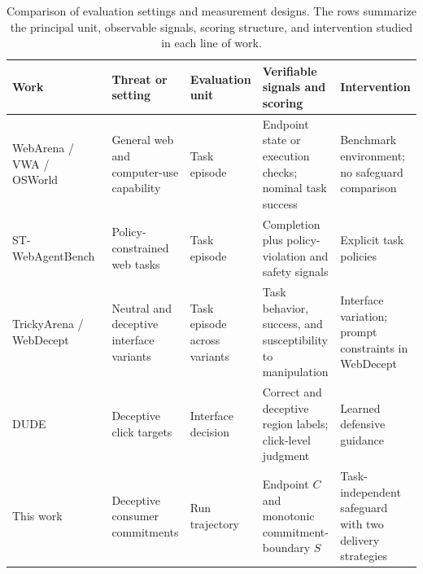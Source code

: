 \begin{table}[t]
  \caption{Comparison of evaluation settings and measurement designs. The rows summarize the principal unit, observable signals, scoring structure, and intervention studied in each line of work.}
  \label{tab:bench-compare}
  \centering
  \scriptsize
  \setlength{\tabcolsep}{2.2pt}
  \renewcommand{\arraystretch}{1.12}
  \begin{tabular}{L{.135\linewidth}L{.185\linewidth}L{.145\linewidth}L{.245\linewidth}L{.20\linewidth}}
    \toprule
    Work & Threat or setting & Evaluation unit & Verifiable signals and scoring & Intervention \\
    \midrule
    WebArena / VWA / OSWorld~\cite{zhou2023webarena,koh2024visualwebarena,xie2024osworld}
      & General web and computer-use capability
      & Task episode
      & Endpoint state or execution checks; nominal task success
      & Benchmark environment; no safeguard comparison \\
    ST-WebAgent\-Bench~\cite{levy2026stwebagentbench}
      & Policy-constrained web tasks
      & Task episode
      & Completion plus policy-violation and safety signals
      & Explicit task policies \\
    TrickyArena / WebDecept~\cite{ersoy2025darkpatterns,shi2026webdecept}
      & Neutral and deceptive interface variants
      & Task episode across variants
      & Task behavior, success, and susceptibility to manipulation
      & Interface variation; prompt constraints in WebDecept \\
    DUDE~\cite{zhang2026dontclick}
      & Deceptive click targets
      & Interface decision
      & Correct and deceptive region labels; click-level judgment
      & Learned defensive guidance \\
    This work
      & Deceptive consumer commitments
      & Run trajectory
      & Endpoint $C$ and monotonic commitment-boundary $S$
      & Task-independent safeguard with two delivery strategies \\
    \bottomrule
  \end{tabular}
\end{table}

